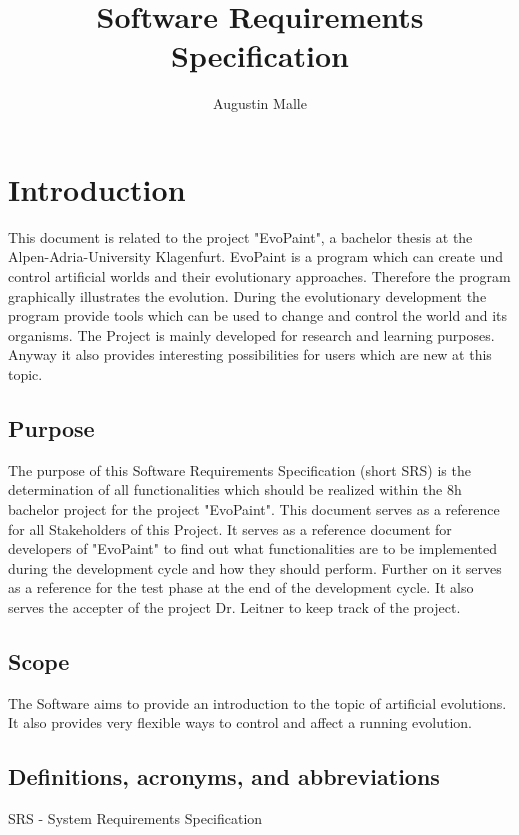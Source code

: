 \documentclass[titlepage,12pt]{scrartcl}
\begin{document}
\title{Software Requirements Specification}
\author{Augustin Malle}

\subject{EvoPaint}

\maketitle

\thispagestyle{empty}
\tableofcontents

\newpage

\section{Introduction}

This document is related to the project "EvoPaint", a bachelor thesis at the Alpen-Adria-University Klagenfurt. EvoPaint is a program which can create und control artificial worlds and their evolutionary approaches. Therefore the program graphically illustrates the evolution. During the evolutionary development the program provide tools which can be used to change and control the world and its organisms. The Project is mainly developed for research and learning purposes. Anyway it also provides interesting possibilities for users which are new at this topic.

\subsection{Purpose}
The purpose of this Software Requirements Specification (short SRS) is the determination of all functionalities which should be realized within the 8h bachelor project for the project "EvoPaint". This document serves as a reference for all Stakeholders of this Project. It serves as a reference document for developers of "EvoPaint" to find out what functionalities are to be implemented during the development cycle and how they should perform. Further on it serves as a reference for the test phase at the end of the development cycle. It also serves the accepter of the project Dr. Leitner to keep track of the project.

\subsection{Scope}
The Software aims to provide an introduction to the topic of artificial evolutions. It also provides very flexible ways to control and affect a running evolution. 

\subsection{Definitions, acronyms, and abbreviations}
SRS - System Requirements Specification
\end{document}
